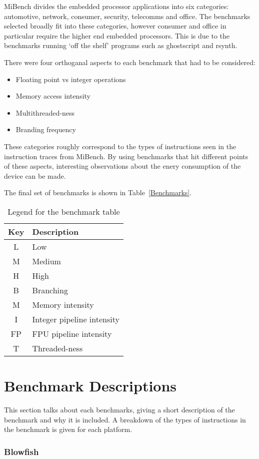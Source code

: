 \documentclass[twocolumn]{article}
\newcommand{\nsection}[1]{\section{\bfseries #1}}
\begin{document}
MiBench divides the embedded processor applications into six categories: automotive, network, consumer, security, telecomms and office. The benchmarks selected broadly fit into these categories, however consumer and office in particular require the higher end embedded processors. This is due to the benchmarks running `off the shelf' programs such as ghostscript and rsynth.

There were four orthoganal aspects to each benchmark that had to be considered:
\begin{itemize}
	\item Floating point vs integer operations
	\item Memory access intensity
	\item Multithreaded-ness
	\item Branding frequency
\end{itemize}

These categories roughly correspond to the types of instructions seen in the instruction traces from MiBench. By using benchmarks that hit different points of these aspects, interesting observations about the enery consumption of the device can be made.

The final set of benchmarks is shown in Table~\ref{Benchmarks}.

\begin{table}
\centering
	\begin{tabular}{c l}
		Key & Description \\
		\hline
		L	&	Low \\
		M	&	Medium \\
		H	&	High \\
		\hline
		B	&	Branching \\
		M	&	Memory intensity \\
		I	&	Integer pipeline intensity \\
		FP	&	FPU pipeline intensity \\
		T	&	Threaded-ness \\
	\end{tabular}
	\caption{Legend for the benchmark table}
	\label{BenchmarkLegend}
\end{table}

\nsection{Benchmark Descriptions}

This section talks about each benchmarks, giving a short description of the benchmark and why it is included. A breakdown of the types of instructions in the benchmark is given for each platform.

\subsubsection*{Blowfish}
\end{document}
